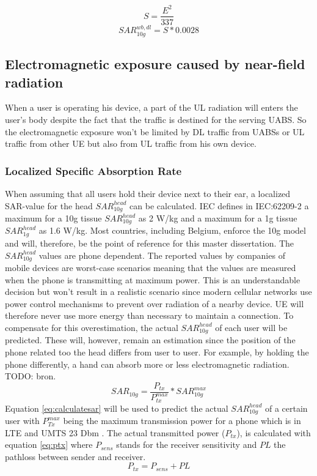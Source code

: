 \begin{equation}
S  = \frac{E^2}{337}
\label{eq:flux}
\end{equation}
\begin{equation}
SAR^{wb,dl}_{10g} = S * 0.0028
\label{eq:convertion}
\end{equation}

\subsection{Electromagnetic exposure caused by near-field radiation}
\label{sub:Uplinkexposure}
When a user is operating his device, a part of the \gls{UL} radiation will enters the user's body despite the fact that the 
 traffic is destined for the serving \gls{UABS}. So the 
 electromagnetic exposure won't be limited by \gls{DL} traffic from \gls{UABS}s or \gls{UL} traffic 
from other \gls{UE} but also from \gls{UL} traffic from his own device.

\subsubsection{Localized Specific Absorption Rate}

When assuming that all users hold their device next to their ear, a localized SAR-value for the head $SAR^{head}_{10g}$ can be calculated.
\gls{IEC} defines in IEC:62209-2 a maximum for a 10g tissue $SAR^{head}_{10g}$ as 2 W/kg and a maximum for a 1g tissue $SAR^{head}_{1g}$ as 1.6 W/kg.
Most countries, including Belgium, enforce the 10g model and will, therefore, be the point of reference for this master dissertation.
The $SAR^{head}_{10g}$ values are phone dependent. The reported values by companies of mobile devices are worst-case scenarios meaning that the 
values are measured when the phone is transmitting at maximum power. This is an understandable decision but won't result in a realistic scenario since 
modern cellular networks use power control mechanisms to prevent over radiation of a nearby device. \gls{UE} will therefore never use more energy than 
necessary to maintain a connection.
To compensate for this overestimation, the actual $SAR^{head}_{10g}$ of each user will be predicted. These will, however, remain an estimation since the 
position of the phone related too the head differs from user to user. For example, by holding the phone differently, a hand can absorb more or less 
electromagnetic radiation. TODO: bron. 
\begin{equation}
{SAR}_{10g} = \frac{P_{tx}}{P^{max}_{tx}} * {SAR}^{max}_{10g}
\label{eq:calculatesar}
\end{equation}
Equation \ref{eq:calculatesar} will be used to predict the actual $SAR^{head}_{10g}$  of a certain user with 
$P^{max}_{Tx}$ being the maximum transmission power for a phone which is in \gls{LTE} and UMTS 23 Dbm \cite{J11_maxTpxUE, J10_RDP}.
The actual transmitted power ($P_{tx}$), is calculated with equation \ref{eq:ptx} where $P_{sens}$
stands for the receiver sensitivity and $PL$ the pathloss between sender and receiver.
\begin{equation}
P_{tx} = P_{sens} + PL
\label{eq:ptx}
\end{equation}
 

